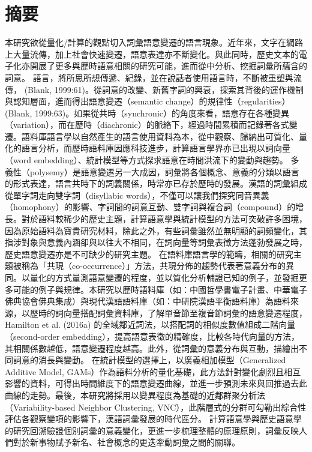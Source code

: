 \chapter*{摘要}
本研究欲從量化/計算的觀點切入詞彙語意變遷的語言現象。近年來，文字在網路上大量流傳，加上社會快速變遷，語意表達亦不斷變化。與此同時，歷史文本的電子化亦開展了更多與歷時語意相關的研究可能，進而從中分析、挖掘詞彙所蘊含的詞意。 語言，將所思所想傳遞、紀錄，並在說話者使用語言時，不斷被重塑與流傳， (Blank, 1999:61)。從詞意的改變、新舊字詞的興衰，探索其背後的運作機制與認知層面，進而得出語意變遷（semantic change）的規律性（regularities）(Blank, 1999:63)。如果從共時（synchronic）的角度來看，語意存在各種變異（variation），而在歷時（diachronic）的脈絡下，經過時間累積而記錄著各式變遷。語料庫語言學以自然產生的語言使用資料為本，從中觀察、歸納出可質化、量化的語言分析，而歷時語料庫因應科技進步，計算語言學界亦已出現以詞向量（word embedding）、統計模型等方式探求語意在時間洪流下的變動與趨勢。 多義性（polysemy）是語意變遷另一大成因，詞彙將各個概念、意義的分類以語言的形式表達，語言共時下的詞義關係，時常亦已存於歷時的發展。漢語的詞彙組成從單字詞走向雙字詞（disyllabic words），不僅可以讓我們探究同音異義（homophony）的影響、字詞間的詞意互動、雙字詞與複合詞（compound）的增長。對於語料較稀少的歷史主題，計算語意學與統計模型的方法可突破許多困境，因為原始語料為寶貴研究材料，除此之外，有些詞彙雖然並無明顯的詞頻變化，其指涉對象與意義內涵卻與以往大不相同，在詞向量等詞彙表徵方法蓬勃發展之時，歷史語意變遷亦是不可缺少的研究主題。 在語料庫語言學的範疇，相關的研究主題被稱為「共現（co-occurrence）」方法，共現分佈的趨勢代表著意義分布的異同。以量化的方式量測語意變遷的程度，並以質化分析輔證已知的例子，並發掘更多可能的例子與規律。本研究以歷時語料庫（如：中國哲學書電子計畫、中華電子佛典協會佛典集成）與現代漢語語料庫（如：中研院漢語平衡語料庫）為語料來源，以歷時的詞向量搭配詞彙資料庫，了解單音節至複音節詞彙的語意變遷程度，Hamilton et al. (2016a) 的全域鄰近詞法，以搭配詞的相似度數值組成二階向量（second-order embedding），提高語意表徵的精確度，比較各時代向量的方法，其相關係數越低，語意變遷程度越高。此外，從詞彙的意義分布與互動，描繪出不同詞意的消長與變動。 在統計模型的選擇上，以廣義相加模型（Generalized Additive Model, GAMs）作為語料分析的量化基礎，此方法針對變化劇烈且相互影響的資料，可得出時間維度下的語意變遷曲線，並進一步預測未來與回推過去此曲線的走勢。最後，本研究將採用以變異程度為基礎的近鄰群聚分析法（Variability-based Neighbor Clustering, VNC），此階層式的分群可勾勒出綜合性評估各觀察變項的影響下，漢語詞彙發展的時代區分。 計算語意學與歷史語意學的研究回溯驗證個別詞彙的意義變化，更進一步梳理整體的原理原則，詞彙反映人們對於新事物賦予新名、社會概念的更迭牽動詞彙之間的關聯。


